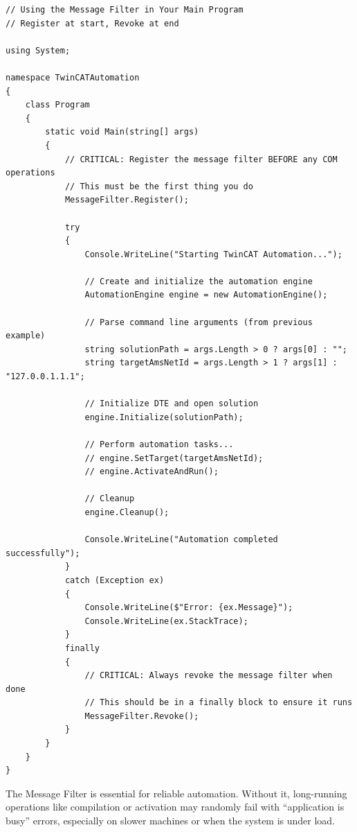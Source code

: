 \documentclass[11pt,a4paper]{article}
\begin{document}
\begin{lstlisting}[style=csharpstyle]
// Using the Message Filter in Your Main Program
// Register at start, Revoke at end

using System;

namespace TwinCATAutomation
{
    class Program
    {
        static void Main(string[] args)
        {
            // CRITICAL: Register the message filter BEFORE any COM operations
            // This must be the first thing you do
            MessageFilter.Register();
            
            try
            {
                Console.WriteLine("Starting TwinCAT Automation...");
                
                // Create and initialize the automation engine
                AutomationEngine engine = new AutomationEngine();
                
                // Parse command line arguments (from previous example)
                string solutionPath = args.Length > 0 ? args[0] : "";
                string targetAmsNetId = args.Length > 1 ? args[1] : "127.0.0.1.1.1";
                
                // Initialize DTE and open solution
                engine.Initialize(solutionPath);
                
                // Perform automation tasks...
                // engine.SetTarget(targetAmsNetId);
                // engine.ActivateAndRun();
                
                // Cleanup
                engine.Cleanup();
                
                Console.WriteLine("Automation completed successfully");
            }
            catch (Exception ex)
            {
                Console.WriteLine($"Error: {ex.Message}");
                Console.WriteLine(ex.StackTrace);
            }
            finally
            {
                // CRITICAL: Always revoke the message filter when done
                // This should be in a finally block to ensure it runs
                MessageFilter.Revoke();
            }
        }
    }
}
\end{lstlisting}

\begin{tipbox}
The Message Filter is essential for reliable automation. Without it, long-running operations like compilation or activation may randomly fail with ``application is busy'' errors, especially on slower machines or when the system is under load.
\end{tipbox}
\end{document}
